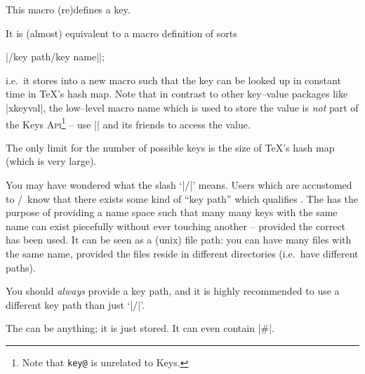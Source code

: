 \documentclass[a4paper,doc2]{ltxdoc}
\def\API{\textsc{Api}}%
\begin{document}
\begin{command}{\pgfkeyssetvalue{}}
	This macro (re)defines a key.

	It is (almost) equivalent to a macro definition of sorts

|\expandafter\def\csname key@|\meta{/key path/key name}|\endcsname|;

	i.e.\ it stores  into a new macro such that the key can be looked up in constant time in \TeX's hash map.
	Note that in contrast to other key--value packages like |xkeyval|, the low--level macro name which is used to store the value is \emph{not} part of the \PGF Keys \API\footnote{Note that \texttt{key@} is unrelated to \PGF Keys.} -- use |\pgfkeysgetvalue| and its friends to access the value.

	The only limit for the number of possible keys is the size of \TeX's hash map (which is very large).

	You may have wondered what the slash `|/|' means. Users which are accustomed to \PGF/\PGFPlots\ know that there exists some kind of ``key path'' which qualifies . The  has the purpose of providing a name space such that many many keys with the same name can exist piecefully without ever touching another -- provided the correct  has been used. It can be seen as a (unix) file path: you can have many files with the same name, provided the files reside in different directories (i.e.\ have different paths).

	You should \emph{always} provide a key path, and it is highly recommended to use a different key path than just `|/|'.

	The  can be anything; it is just stored. It can even contain |#|.
\end{command}
\end{document}
